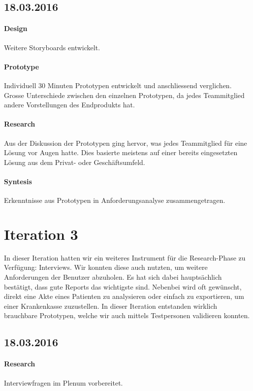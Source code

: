 \documentclass[a4paper]{scrreprt}
\begin{document}
\subsection*{18.03.2016}
\paragraph{Design}
Weitere Storyboards entwickelt.


\paragraph{Prototype}
Individuell 30 Minuten Prototypen entwickelt und anschliessend verglichen. Grosse Unterschiede zwischen den einzelnen Prototypen, da jedes Teammitglied andere Vorstellungen des Endprodukts hat.

\paragraph{Research}
Aus der Diskussion der Prototypen ging hervor, was jedes Teammitglied für eine Lösung vor Augen hatte. Dies basierte meistens auf einer bereits eingesetzten Lösung aus dem Privat- oder Geschäftsumfeld. 

\paragraph{Syntesis}
Erkenntnisse aus Prototypen in Anforderungsanalyse zusammengetragen.



\section{Iteration 3}
In dieser Iteration hatten wir ein weiteres Instrument für die Research-Phase zu Verfügung: Interviews. Wir konnten diese auch nutzten, um weitere Anforderungen der Benutzer abzuholen. Es hat sich dabei hauptsächlich bestätigt, dass gute Reports das wichtigste sind. Nebenbei wird oft gewünscht, direkt eine Akte eines Patienten zu analysieren oder einfach zu exportieren, um einer Krankenkasse zuzustellen.
In dieser Iteration entstanden wirklich brauchbare Prototypen, welche wir auch mittels Testpersonen validieren konnten.

\subsection*{18.03.2016}

\paragraph{Research}
Interviewfragen im Plenum vorbereitet.
\end{document}
